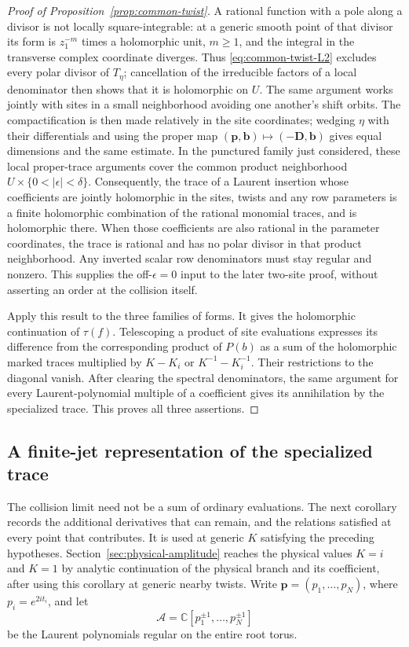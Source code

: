 \begin{proof}[Proof of Proposition~\ref{prop:common-twist}]
A rational function with a pole along a divisor is not locally
square-integrable: at a generic smooth point of that divisor its
form is $z_1^{-m}$ times a holomorphic unit, $m\ge1$, and the
integral in the transverse complex coordinate diverges. Thus
\eqref{eq:common-twist-L2} excludes every polar divisor of
$T_\eta$; cancellation of the irreducible factors of a local denominator
then shows that it is holomorphic on $U$. The same argument works
jointly with sites in a small neighborhood avoiding one another's
shift orbits. The compactification is then made relatively in the
site coordinates; wedging $\eta$ with their differentials and using
the proper map $(\mathbf p,\mathbf b)\mapsto(-\mathbf D,\mathbf b)$
gives equal dimensions and the same estimate.
In the punctured family just considered, these local proper-trace
arguments cover the common product neighborhood
$U\times\{0<|\epsilon|<\delta\}$. Consequently, the trace of a Laurent
insertion whose coefficients are jointly holomorphic in the sites,
twists and any row parameters is a finite holomorphic combination
of the rational monomial traces, and is holomorphic there. When
those coefficients are also rational in the parameter coordinates,
the trace is rational and has no polar divisor in that product
neighborhood. Any inverted scalar row denominators must stay
regular and nonzero. This supplies the off-$\epsilon=0$ input to
the later two-site proof, without asserting an order at the
collision itself.

Apply this result to the three families of forms. It gives the
holomorphic continuation of $\tau(f)$. Telescoping a product of
site evaluations expresses its difference from the corresponding
product of $P(b)$ as a sum of the holomorphic marked traces
multiplied by $K-K_i$ or $K^{-1}-K_i^{-1}$. Their restrictions to
the diagonal vanish. After clearing the spectral denominators,
the same argument for every Laurent-polynomial multiple of a
coefficient gives its annihilation by the specialized trace.
This proves all three assertions.
\end{proof}

\subsection{A finite-jet representation of the specialized trace}

The collision limit need not be a sum of ordinary evaluations. The next corollary records the additional derivatives that can remain, and the relations satisfied at every point that contributes. It is used at generic $K$ satisfying the preceding hypotheses. Section~\ref{sec:physical-amplitude} reaches the physical values $K=i$ and $K=1$ by analytic continuation of the physical branch and its coefficient, after using this corollary at generic nearby twists. Write $\mathbf p=(p_1,\ldots,p_N)$, where $p_i=e^{2it_i}$, and let
\[
 \mathcal A=\mathbb C[p_1^{\pm1},\ldots,p_N^{\pm1}]
\]
be the Laurent polynomials regular on the entire root torus.

